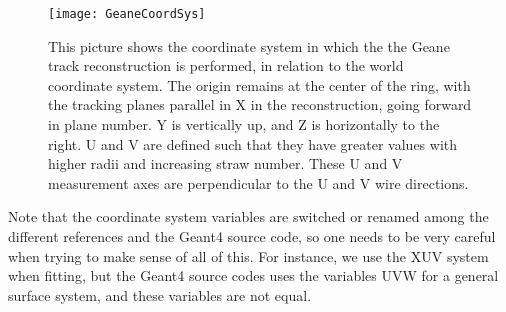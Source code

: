 	\begin{figure}[]
		\caption{This picture shows the coordinate system in which the the Geane track reconstruction is performed, in relation to the world coordinate system. The origin remains at the center of the ring, with the tracking planes parallel in X in the reconstruction, going forward in plane number. Y is vertically up, and Z is horizontally to the right. U and V are defined such that they have greater values with higher radii and increasing straw number. These U and V measurement axes are perpendicular to the U and V wire directions.}
	\centering
	\texttt{[image: GeaneCoordSys]}
	\label{fig:GeaneCoordSys}
	\end{figure}

	
	Note that the coordinate system variables are switched or renamed among the different references and the Geant4 source code, so one needs to be very careful when trying to make sense of all of this. For instance, we use the XUV system when fitting, but the Geant4 source codes uses the variables UVW for a general surface system, and these variables are not equal. 
